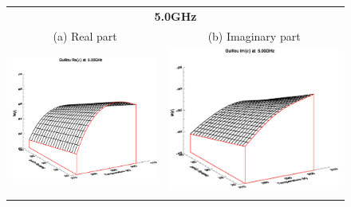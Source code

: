 \begin{figure}[htp]
  \centering
  \begin{tabular}{c c}
    \multicolumn{2}{c}{\sffamily\textbf{5.0GHz}}\\
    \textsf{(a) Real part} &
    \textsf{(b) Imaginary part} \\
    \includegraphics[bb=135 240 508 540,clip,scale=0.5]{graphics/Guillou/e_re_5.00GHz.eps} &
    \includegraphics[bb=135 240 508 540,clip,scale=0.5]{graphics/Guillou/e_im_5.00GHz.eps} \\\\


\end{tabular}
\end{figure}
